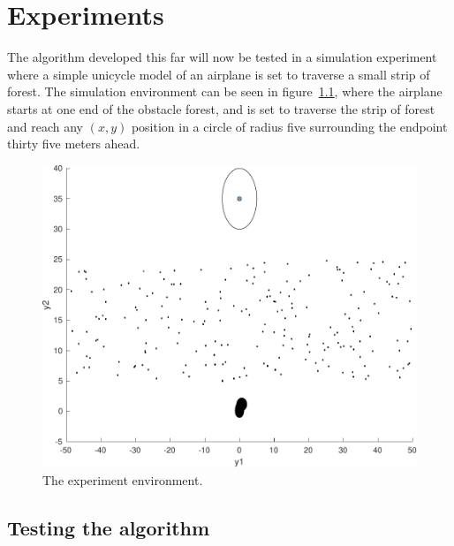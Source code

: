 \chapter{Experiments}
\label{chp:experiments}

The \rrtfunnel{} algorithm developed this far will now be tested in a simulation
experiment where a simple unicycle model of an airplane is set to traverse a
small strip of forest. The simulation environment can be seen in
figure~\cref{fig:simulated-forest}, where the airplane starts at one end of the
obstacle forest, and is set to traverse the strip of forest and reach any
\((x,y)\) position in a circle of radius five surrounding the endpoint thirty
five meters ahead.

\begin{figure}
  \centering \includegraphics[width=\textwidth]{figures/experiments/simulated-forest} \caption{The experiment
    environment.}
  \label{fig:simulated-forest}
\end{figure}

\section{Testing the \rrtfunnel{} algorithm}

